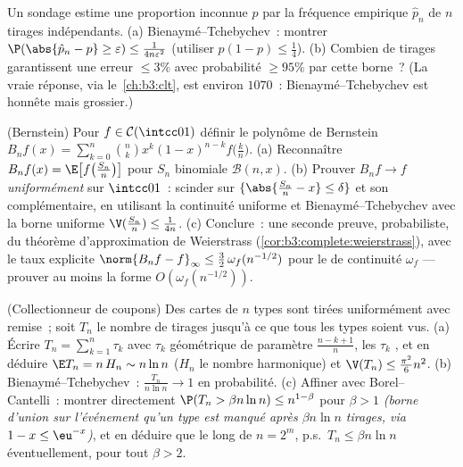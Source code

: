 \begin{exercise}[$\star\star$]\label{exo:b3:probability:7}
Un sondage estime une proportion inconnue $p$ par la
fréquence empirique $\hat p_n$ de $n$ tirages indépendants.
(a) Bienaymé--Tchebychev~: montrer $\P(\abs{\hat p_n - p}
\geq \varepsilon) \leq \frac1{4n\varepsilon^2}$ (utiliser
$p(1-p) \leq \frac14$).
(b) Combien de tirages garantissent une erreur $\leq 3\%$
avec probabilité $\geq 95\%$ par cette borne~? (La vraie
réponse, via le~\cref{ch:b3:clt}, est environ $1070$~:
Bienaymé--Tchebychev est honnête mais grossier.)
\end{exercise}

\begin{exercise}[$\star\star\star$]\label{exo:b3:probability:8}
(Bernstein) Pour $f \in \mathcal C(\intcc01)$ définir le
polynôme de Bernstein $B_nf(x) =
\sum_{k=0}^n\binom nkx^k(1-x)^{n-k}f\bigl(\frac kn\bigr)$.
(a) Reconnaître $B_nf(x) = \E\bigl[f\bigl(\frac
{S_n}n\bigr)\bigr]$ pour $S_n$ binomiale $\mathcal B(n, x)$.
(b) Prouver $B_nf \to f$ \emph{uniformément} sur
$\intcc01$~: scinder sur $\{\abs{\frac{S_n}n - x} \leq
\delta\}$ et son complémentaire, en utilisant la continuité
uniforme et Bienaymé--Tchebychev avec la borne uniforme
$\V(\frac{S_n}n) \leq \frac1{4n}$.
(c) Conclure~: une seconde preuve, probabiliste, du théorème
d'approximation de Weierstrass
(\cref{cor:b3:complete:weierstrass}), avec le taux explicite
$\norm{B_nf - f}_\infty \leq \frac32\,\omega_f(n^{-1/2})$
pour le  de continuité $\omega_f$ --- prouver au
moins la forme $O(\omega_f(n^{-1/2}))$.
\end{exercise}

\begin{exercise}[$\star\star\star$]\label{exo:b3:probability:9}
(Collectionneur de coupons) Des cartes de $n$ types sont
tirées uniformément avec remise~; soit $T_n$ le nombre de
tirages jusqu'à ce que tous les types soient vus.
(a) Écrire $T_n = \sum_{k=1}^{n}\tau_k$ avec $\tau_k$
géométrique de paramètre $\frac{n - k + 1}n$, les $\tau_k$
, et en déduire $\E T_n = n\,H_n \sim n\ln n$
($H_n$ le nombre harmonique) et $\V(T_n) \leq
\frac{\pi^2}6n^2$.
(b) Bienaymé--Tchebychev~: $\frac{T_n}{n\ln n} \to 1$ en
probabilité.
(c) Affiner avec Borel--Cantelli~: montrer directement
$\P(T_n > \beta n\ln n) \leq n^{1 - \beta}$ pour $\beta >
1$ \emph{(borne d'union sur l'événement qu'un type est manqué
après $\beta n\ln n$ tirages, via $1 - x \leq \eu^{-x}$)},
et en déduire que le long de $n = 2^m$, p.s.\ $T_n \leq
\beta n\ln n$ éventuellement, pour tout $\beta > 2$.
\end{exercise}

